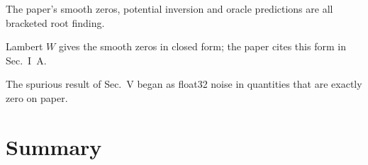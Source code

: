 \begin{keyideas}
\item The paper's smooth zeros, potential inversion and oracle predictions are all bracketed root finding.
\item Lambert $W$ gives the smooth zeros in closed form; the paper cites this form in Sec.~I~A.
\item The spurious result of Sec.~V began as float32 noise in quantities that are exactly zero on paper.
\end{keyideas}

\section{Summary}\label{sec:asymptotics-summary}

